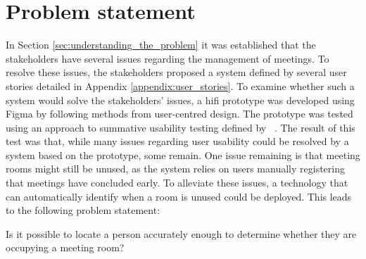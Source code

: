 \section{Problem statement}\label{sec:problem_statement}
In Section \ref{sec:understanding_the_problem} it was established that the stakeholders have several issues regarding the management of meetings. 
To resolve these issues, the stakeholders proposed a system defined by several user stories detailed in Appendix \ref{appendix:user_stories}. 
To examine whether such a system would solve the stakeholders' issues, a hifi prototype was developed using Figma\cite{Figma} by following methods from user-centred design.
The prototype was tested using an approach to summative usability testing defined by \citeauthor{lazar2005web}~\cite{lazar2005web}. 
The result of this test was that, while many issues regarding user usability could be resolved by a system based on the prototype, some remain. 
One issue remaining is that meeting rooms might still be unused, as the system relies on users manually registering that meetings have concluded early.
To alleviate these issues, a technology that can automatically identify when a room is unused could be deployed. This leads to the following problem statement:
\begin{problem_statement}
    Is it possible to locate a person accurately enough to determine whether they are occupying a meeting room?
\end{problem_statement}

